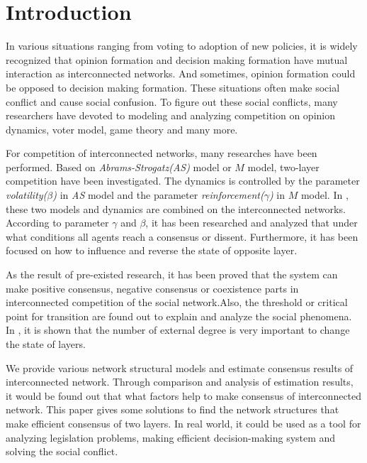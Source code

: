 \documentclass[english]{cccconf}
\begin{document}
\section{Introduction}
In various situations ranging from voting to adoption of new policies, it is widely recognized that opinion formation and decision making formation have mutual interaction as interconnected networks\cite{bianconi2018,domenico2013,tomasini2015, kimsangwoo2012,newman2010,boccaletti2014,mikko2013,huberman2004}. And sometimes, opinion formation could be opposed to decision making formation. These situations often make social conflict and cause social confusion. To figure out these social conflicts, many researchers have devoted to modeling and analyzing competition on opinion dynamics\cite{amato2017,quattrociocchi2014,haibo2017}, voter model\cite{redner2017}, game theory\cite{smyrnakis2019} and many more\cite{danziger2019,namkhanhvu2017,laguna2004,masuda2015,zuev2012}.  
 
For competition of interconnected networks, many researches have been performed\cite{alvarez2016,gomez2015,diep2017,rocca2014,velasquez2018}. Based on \textit{Abrams-Strogatz(AS)} model\cite{abrams2003,vazquez2010} or $M$ model\cite{rocca2014}, two-layer competition have been investigated. The dynamics is controlled by the parameter \textit{volatility($\beta$)} in \textit{AS} model and the parameter \textit{reinforcement($\gamma$)} in $M$ model. In \cite{alvarez2016}, these two models and dynamics are combined on the interconnected networks. According to parameter $\gamma$ and $\beta$, it has been researched and analyzed that under what conditions all agents reach a consensus or dissent. Furthermore, it has been focused on how to influence and reverse the state of opposite layer.    

As the result of pre-existed research, it has been proved that the system can make positive consensus, negative consensus or coexistence parts in interconnected competition of the social network\cite{alvarez2016, amato2017}.Also, the threshold or critical point for transition are found out to explain and analyze the social phenomena\cite{alvarez2016, gomez2015, diep2017}. In \cite{gomez2015}, it is shown that the number of external degree is very important to change the state of layers.

We provide various network structural models and estimate consensus results of interconnected network. Through comparison and analysis of estimation results, it would be found out that what factors help to make consensus of interconnected network. This paper gives some solutions to find the network structures that make efficient consensus of two layers. In real world, it could be used as a tool for analyzing legislation problems, making efficient decision-making system and solving the social conflict.  
\end{document}
